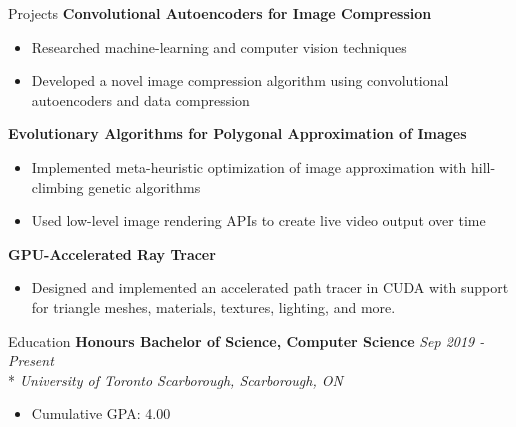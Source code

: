 \documentclass[11pt, letterpaper]{article}
\begin{document}
\begin{section}{Projects}
\textbf{Convolutional Autoencoders for Image Compression}
\begin{itemize}
  \item Researched machine-learning and computer vision techniques
  \item Developed a novel image compression algorithm using convolutional autoencoders and data compression\\
\end{itemize}

\textbf{Evolutionary Algorithms for Polygonal Approximation of Images}
\begin{itemize}
  \item Implemented meta-heuristic optimization of image approximation with hill-climbing genetic algorithms
  \item Used low-level image rendering APIs to create live video output over time\\
\end{itemize}

\textbf{GPU-Accelerated Ray Tracer}
\begin{itemize}
  \item Designed and implemented an accelerated path tracer in CUDA with support for triangle meshes, materials, textures, lighting, and more.
\end{itemize}

\end{section}

\begin{section}{Education}
\textbf{Honours Bachelor of Science, Computer Science}
\hfill
\textit{Sep 2019 - Present}\\*
\textit{University of Toronto Scarborough, Scarborough, ON}
\begin{itemize}
  \item Cumulative GPA: 4.00
\end{itemize}

\end{section}
\end{document}
